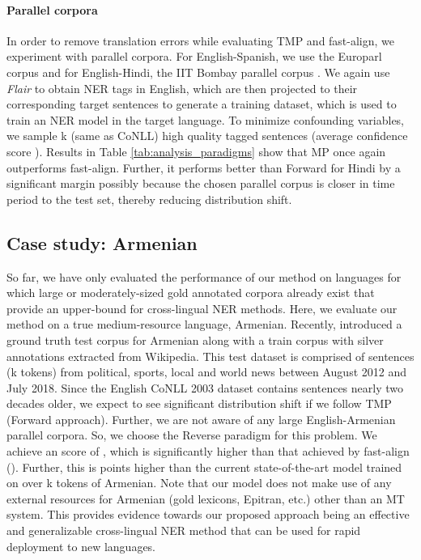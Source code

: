 \documentclass[11pt,a4paper]{article}
\begin{document}
\paragraph{Parallel corpora} 
In order to remove translation errors while evaluating TMP and fast-align, 
we experiment with parallel corpora. 
For English-Spanish, we use the Europarl corpus \cite{koehn2005europarl} 
and for English-Hindi, the IIT Bombay parallel corpus \cite{kunchukuttan2017iit}. 
We again use \textit{Flair} to obtain NER tags in English, 
which are then projected to their corresponding target sentences to generate a training dataset, which is used to train an NER model in the target language. 
To minimize confounding variables, 
we sample k (same as CoNLL) high quality tagged sentences 
(average confidence score ). 
Results in Table \ref{tab:analysis_paradigms} show 
that MP once again outperforms fast-align. 
Further, it performs better than Forward for Hindi 
by a significant margin possibly because the chosen parallel corpus 
is closer in time period to the test set, thereby reducing distribution shift.



 
\subsection{Case study: Armenian \label{subsec:armenian}}
So far, we have only evaluated the performance of our method on languages 
for which large or moderately-sized gold annotated corpora already exist that provide an upper-bound for cross-lingual NER methods. Here, we evaluate our method on a true medium-resource language, Armenian. 
Recently, \citet{ghukasyan2018pioner} introduced a ground truth test corpus for Armenian
along with a train corpus with silver annotations extracted from Wikipedia. 
This test dataset is comprised of  sentences (k tokens) 
from political, sports, local and world news 
between August 2012 and July 2018. 
Since the English CoNLL 2003 dataset contains sentences nearly two decades older, 
we expect to see significant distribution shift 
if we follow TMP (Forward approach). 
Further, we are not aware of any large English-Armenian parallel corpora. 
So, we choose the Reverse paradigm for this problem.
We achieve an  score of , which is significantly higher 
than that achieved by fast-align (). 
Further, this is  points higher than the current state-of-the-art model 
trained on over k tokens of Armenian. Note that our model does not make use of any external resources for Armenian (gold lexicons, Epitran, etc.) other than an MT system. This provides evidence towards our proposed approach being an effective and generalizable cross-lingual NER method that can be used for rapid deployment to new languages.  
\end{document}
